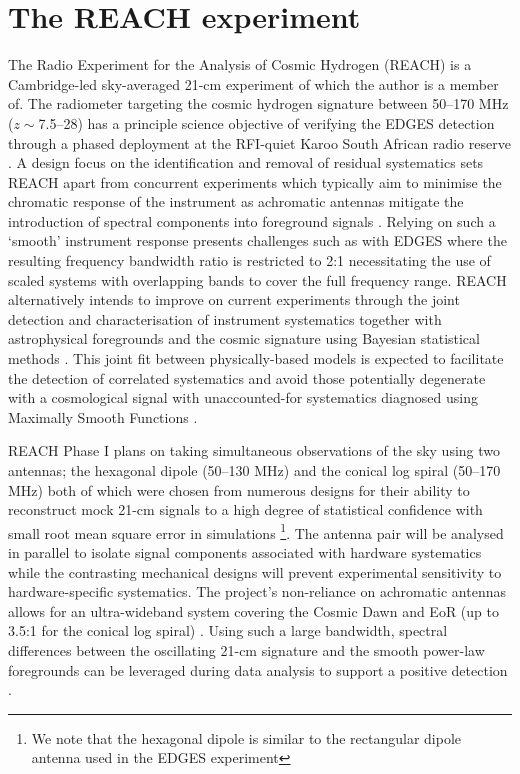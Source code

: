 \section{The REACH experiment}\label{sec:reach}
The Radio Experiment for the Analysis of Cosmic Hydrogen (REACH) is a Cambridge-led sky-averaged 21-cm experiment of which the author is a member of. The radiometer targeting the cosmic hydrogen signature between 50--170 MHz ($z \sim $7.5--28) has a principle science objective of verifying the EDGES detection through a phased deployment at the RFI-quiet Karoo South African radio reserve \citep{reach}. A design focus on the identification and removal of residual systematics sets REACH apart from concurrent experiments which typically aim to minimise the chromatic response of the instrument as achromatic antennas mitigate the introduction of spectral components into foreground signals \citep{edges2008,saras2}. Relying on such a ‘smooth’ instrument response presents challenges such as with EDGES where the resulting frequency bandwidth ratio is restricted to 2:1 necessitating the use of scaled systems with overlapping bands to cover the full frequency range. REACH alternatively intends to improve on current experiments through the joint detection and characterisation of instrument systematics together with astrophysical foregrounds and the cosmic signature using Bayesian statistical methods \citep{dom,dom_modelling}. This joint fit between physically-based models is expected to facilitate the detection of correlated systematics and avoid those potentially degenerate with a cosmological signal with unaccounted-for systematics diagnosed using Maximally Smooth Functions \citep{maxsmooth}.

REACH Phase I plans on taking simultaneous observations of the sky using two antennas; the hexagonal dipole (50--130 MHz) and the conical log spiral (50--170 MHz) both of which were chosen from numerous designs for their ability to reconstruct mock 21-cm signals to a high degree of statistical confidence with small root mean square error in simulations \citep{dom_antenna}\footnote{We note that the hexagonal dipole is similar to the rectangular dipole antenna used in the EDGES experiment}. The antenna pair will be analysed in parallel to isolate signal components associated with hardware systematics while the contrasting mechanical designs will prevent experimental sensitivity to hardware-specific systematics. The project’s non-reliance on achromatic antennas allows for an ultra-wideband system covering the Cosmic Dawn and EoR (up to 3.5:1 for the conical log spiral) \citep{john_antenna}. Using such a large bandwidth, spectral differences between the oscillating 21-cm signature and the smooth power-law foregrounds can be leveraged during data analysis to support a positive detection \citep{reach}.

